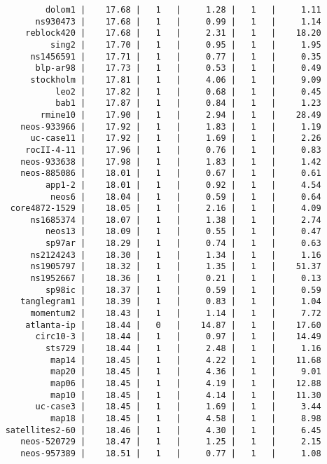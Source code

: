 \begin{lstlisting}
            dolom1 |    17.68 |   1   |     1.28 |   1   |     1.11
          ns930473 |    17.68 |   1   |     0.99 |   1   |     1.14
        reblock420 |    17.68 |   1   |     2.31 |   1   |    18.20
             sing2 |    17.70 |   1   |     0.95 |   1   |     1.95
         ns1456591 |    17.71 |   1   |     0.77 |   1   |     0.35
          blp-ar98 |    17.73 |   1   |     0.53 |   1   |     0.49
         stockholm |    17.81 |   1   |     4.06 |   1   |     9.09
              leo2 |    17.82 |   1   |     0.68 |   1   |     0.45
              bab1 |    17.87 |   1   |     0.84 |   1   |     1.23
           rmine10 |    17.90 |   1   |     2.94 |   1   |    28.49
       neos-933966 |    17.92 |   1   |     1.83 |   1   |     1.19
         uc-case11 |    17.92 |   1   |     1.69 |   1   |     2.26
        rocII-4-11 |    17.96 |   1   |     0.76 |   1   |     0.83
       neos-933638 |    17.98 |   1   |     1.83 |   1   |     1.42
       neos-885086 |    18.01 |   1   |     0.67 |   1   |     0.61
            app1-2 |    18.01 |   1   |     0.92 |   1   |     4.54
             neos6 |    18.04 |   1   |     0.59 |   1   |     0.64
     core4872-1529 |    18.05 |   1   |     2.16 |   1   |     4.09
         ns1685374 |    18.07 |   1   |     1.38 |   1   |     2.74
            neos13 |    18.09 |   1   |     0.55 |   1   |     0.47
            sp97ar |    18.29 |   1   |     0.74 |   1   |     0.63
         ns2124243 |    18.30 |   1   |     1.34 |   1   |     1.16
         ns1905797 |    18.32 |   1   |     1.35 |   1   |    51.37
         ns1952667 |    18.36 |   1   |     0.21 |   1   |     0.13
            sp98ic |    18.37 |   1   |     0.59 |   1   |     0.59
       tanglegram1 |    18.39 |   1   |     0.83 |   1   |     1.04
         momentum2 |    18.43 |   1   |     1.14 |   1   |     7.72
        atlanta-ip |    18.44 |   0   |    14.87 |   1   |    17.60
          circ10-3 |    18.44 |   1   |     0.97 |   1   |    14.49
            sts729 |    18.44 |   1   |     2.48 |   1   |     1.16
             map14 |    18.45 |   1   |     4.22 |   1   |    11.68
             map20 |    18.45 |   1   |     4.36 |   1   |     9.01
             map06 |    18.45 |   1   |     4.19 |   1   |    12.88
             map10 |    18.45 |   1   |     4.14 |   1   |    11.30
          uc-case3 |    18.45 |   1   |     1.69 |   1   |     3.44
             map18 |    18.45 |   1   |     4.58 |   1   |     8.98
    satellites2-60 |    18.46 |   1   |     4.30 |   1   |     6.45
       neos-520729 |    18.47 |   1   |     1.25 |   1   |     2.15
       neos-957389 |    18.51 |   1   |     0.77 |   1   |     1.08

\end{lstlisting}
